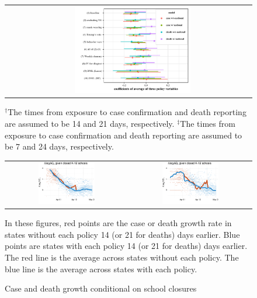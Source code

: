 \documentclass[3p, longtitle]{elsarticle}
\theoremstyle{definition}
\begin{document}
\begin{figure}[ht]
\begin{minipage}{\linewidth}
\begin{tabular}{cc}
      &
      \includegraphics[width=0.5\textwidth]{tables_and_figures/pindex-whisker-7}
          \end{tabular}
  \end{minipage}
    \begin{flushleft}
      \footnotesize
      $^\dagger$The times from exposure to case confirmation and death reporting  are assumed to be 14 and 21 days, respectively. $^\ddagger$The times from exposure to case confirmation and death reporting  are assumed to be 7 and 24 days, respectively.
    \end{flushleft}
\end{figure}


 \begin{figure}
  \caption{Case and death growth conditional on school closures \label{fig:growthpolicies-school}}
  \begin{minipage}{\linewidth}
    \centering
    \begin{tabular}{cc}
       \includegraphics[width=0.483\textwidth]{tables_and_figures/pk12-cases-14}
      &
        \includegraphics[width=0.483\textwidth]{tables_and_figures/pk12-deaths-21}
    \end{tabular}
      \footnotesize In these figures, red points are the case or death
      growth rate in states without each policy 14 (or 21 for deaths)
      days earlier. Blue points are states with each policy 14 (or 21
      for deaths) days earlier. The red line is the average across
      states without each policy. The blue line is the average across
      states with each policy.
  \end{minipage}
\end{figure}
\end{document}
